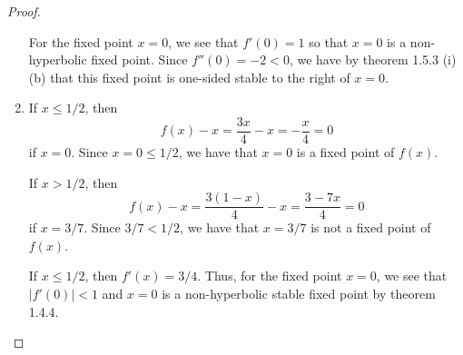 \begin{proof}
\begin{enumerate}
      For the fixed point $x=0$, we see that $f'(0) = 1$ so that $x=0$ is a non-hyperbolic fixed point.
      Since $f''(0) = - 2 < 0$, we have by theorem 1.5.3 (i)(b) that this fixed point is one-sided stable to the right of $x=0$.

    \item If $x\leq 1/2$, then
      $$f(x) -x = \frac{3x}{4} - x = -\frac{x}{4} = 0$$
      if $x=0$. Since $x = 0 \leq 1/2$, we have that $x=0$ is a fixed point of $f(x)$.

      If $x > 1/2$, then
      $$f(x) -x = \frac{3(1-x)}{4} - x = \frac{3 - 7 x}{4} = 0$$
      if $x=3/7$. Since $3/7 < 1/2$, we have that $x = 3/7$ is not a fixed point of $f(x)$.

      If $x \leq 1/2$, then $f'(x) = 3/4$. Thus, for the fixed point $x=0$, we see
      that $|f'(0)| < 1$ and $x=0$ is a non-hyperbolic stable fixed point by theorem 1.4.4.
  \end{enumerate}
\end{proof}
\newpage

